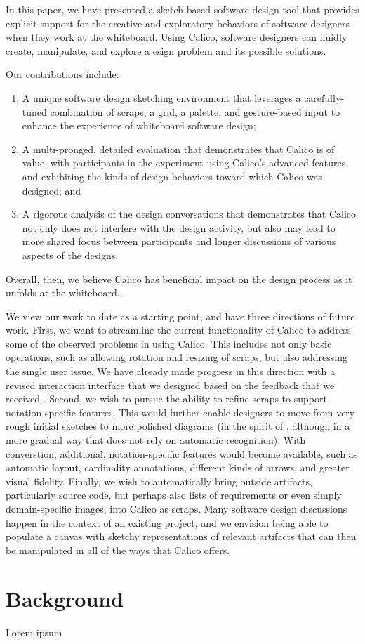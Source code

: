 In this paper, we have presented a sketch-based software design tool that provides explicit support for the creative and exploratory behaviors of software designers when they work at the whiteboard. Using Calico, software designers can fluidly create, manipulate, and explore a esign problem and its possible solutions. 

Our contributions include: 
\begin{enumerate}

\item A unique software design sketching environment that leverages a carefully-tuned combination of scraps, a grid, a palette, and gesture-based input to enhance the experience of whiteboard software design; 
\item A multi-pronged, detailed evaluation that demonstrates that Calico is of value, with participants in the experiment using Calico's advanced features and exhibiting the kinds of design behaviors toward which Calico was designed; and 
\item A rigorous analysis of the design conversations that demonstrates that Calico not only does not interfere with the design activity, but also may lead to more shared focus between participants and longer discussions of various aspects of the designs.

\end{enumerate}
Overall, then, we believe Calico has beneficial impact on the design process as it unfolds at the whiteboard. 

We view our work to date as a starting point, and have three directions of future work. First, we want to streamline the current functionality of Calico to address some of the observed problems in using Calico. This includes not only basic operations, such as allowing rotation and resizing of scraps, but also addressing the single user issue. We have already made progress in this direction with a revised interaction interface that we designed based on the feedback that we received \citep{Mangano2}.  Second, we wish to pursue the ability to refine scraps to support notation-specific features.  This would further enable designers to move from very rough initial sketches to more polished diagrams (in the spirit of \citep{Plimmer2}, although in a more gradual way that does not rely on automatic recognition). With converstion, additional, notation-specific features would become available, such as automatic layout, cardinality annotations, different kinds of arrows, and greater visual fidelity. Finally, we wish to automatically bring outside artifacts, particularly source code, but perhaps also lists of requirements or even simply domain-specific images, into Calico as scraps. Many software design discussions happen in the context of an existing project, and we envision being able to populate a canvas with sketchy representations of relevant artifacts that can then be manipulated in all of the ways that Calico offers.


\section{Background}

Lorem ipsum


